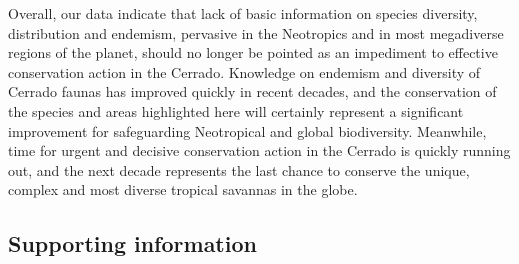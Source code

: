 \documentclass[12pt,openright,oneside,a4paper,english]{abntex2}
\begin{document}
Overall, our data indicate that lack of basic information on species diversity, distribution and endemism, pervasive in the Neotropics and in most megadiverse regions of the planet, should no longer be pointed as an impediment to effective conservation action in the Cerrado. Knowledge on endemism and diversity of Cerrado faunas has improved quickly in recent decades, and the conservation of the species and areas highlighted here will certainly represent a significant improvement for safeguarding Neotropical and global biodiversity. Meanwhile, time for urgent and decisive conservation action in the Cerrado is quickly running out, and the next decade represents the last chance to conserve the unique, complex and most diverse tropical savannas in the globe.

\pagebreak

\begin{landscape}
\section{Supporting information}\label{sec:supinfo-1}

\end{landscape}
\end{document}

